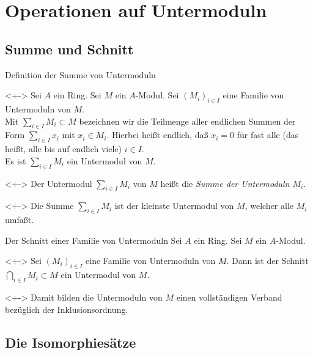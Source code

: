 \section{Operationen auf Untermoduln}

\subsection{Summe und Schnitt}

\begin{frame}{Definition der Summe von Untermoduln}
	\begin{visibleenv}<+->
		Sei \(A\) ein Ring. Sei \(M\) ein \(A\)-Modul.
		Sei \((M_i)_{i \in I}\) eine Familie von Untermoduln von \(M\).
		\\
		Mit \(\sum\limits_{i \in I} M_i \subset M\) bezeichnen wir die Teilmenge aller
		endlichen
		Summen der Form \(\sum\limits_{i \in I} x_i\) mit \(x_i \in M_i\). Hierbei heißt
		endlich, daß \(x_i = 0\) für fast alle (das heißt, alle bis auf endlich viele)
		\(i \in I\).
		\\
		Es ist \(\sum\limits_{i \in I} M_i\) ein Untermodul von \(M\).
	\end{visibleenv}
	\begin{definition}<+->
		Der Untermodul \(\sum\limits_{i \in I} M_i\) von \(M\) heißt die
		\emph{Summe der Untermoduln \(M_i\)}.
	\end{definition}
	\begin{remark}<+->
		Die Summe \(\sum\limits_{i \in I} M_i\) ist der kleinste Untermodul von \(M\),
		welcher alle \(M_i\) umfaßt.
	\end{remark}
\end{frame}

\begin{frame}{Der Schnitt einer Familie von Untermoduln}
	Sei \(A\) ein Ring. Sei \(M\) ein \(A\)-Modul.
	\begin{proposition}<+->
		Sei \((M_i)_{i \in I}\) eine Familie von
		Untermoduln von \(M\). Dann ist der Schnitt \(\bigcap\limits_{i \in I} M_i \subset M\)
		ein Untermodul von \(M\).
	\end{proposition}
	\begin{remark}<+->
		Damit bilden die Untermoduln von \(M\) einen vollständigen Verband bezüglich der
		Inklusionsordnung.
	\end{remark}
\end{frame}

\subsection{Die Isomorphiesätze}

